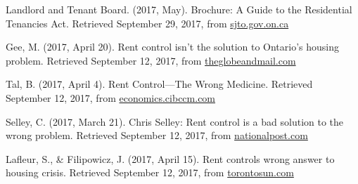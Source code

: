 
\begin{thebibliography}{9}

 Landlord and Tenant Board. (2017, May). Brochure: A Guide to the Residential Tenancies Act. Retrieved September 29, 2017, from \href{http://www.sjto.gov.on.ca/documents/ltb/Brochures/Guide\%20to\%20RTA\%20(English).html}{sjto.gov.on.ca}

 Gee, M. (2017, April 20). Rent control isn't the solution to Ontario's housing problem. Retrieved September 12, 2017, from \href{https://beta.theglobeandmail.com/news/toronto/rent-control-isnt-the-solution-to-ontarios-housing-problem/article34753102/}{theglobeandmail.com}

 Tal, B. (2017, April 4). Rent Control—The Wrong Medicine. Retrieved September 12, 2017, from \href{https://economics.cibccm.com/economicsweb/cds?ID=2595&TYPE=EC_PDF}{economics.cibccm.com}

 Selley, C. (2017, March 21). Chris Selley: Rent control is a bad solution to the wrong problem. Retrieved September 12, 2017, from \href{http://nationalpost.com/news/toronto/chris-selley-rent-control-is-a-bad-solution-to-the-wrong-problem}{nationalpost.com}

 Lafleur, S., \& Filipowicz, J. (2017, April 15). Rent controls wrong answer to housing crisis. Retrieved September 12, 2017, from \href{http://www.torontosun.com/2017/04/15/rent-controls-wrong-answer-to-housing-crisis}{torontosun.com}

\end{thebibliography}

